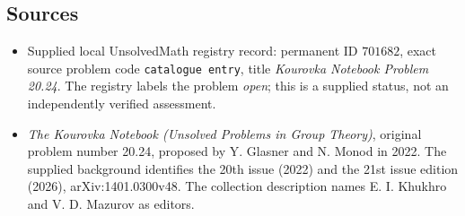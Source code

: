 \documentclass[11pt]{article}
\begin{document}
\subsection{Sources}
\begin{itemize}
\item Supplied local UnsolvedMath registry record: permanent ID \(701682\), exact source problem code \texttt{catalogue entry}, title \emph{Kourovka Notebook Problem 20.24}. The registry labels the problem \emph{open}; this is a supplied status, not an independently verified assessment.
\item \emph{The Kourovka Notebook (Unsolved Problems in Group Theory)}, original problem number 20.24, proposed by Y. Glasner and N. Monod in 2022. The supplied background identifies the 20th issue (2022) and the 21st issue edition (2026), arXiv:1401.0300v48. The collection description names E. I. Khukhro and V. D. Mazurov as editors.
\end{itemize}
\end{document}
